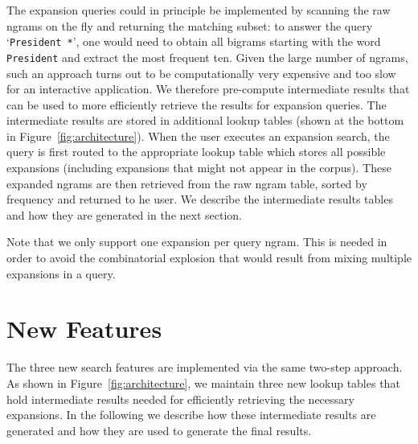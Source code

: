 \documentclass[11pt,a4paper]{article}
\newcommand{\query}[1]{\texttt{#1}}
\begin{document}
The expansion queries could in principle be implemented by scanning the raw ngrams on the fly and returning the matching subset: to answer the query `\query{President *}', one would need to obtain all bigrams starting with the word \query{President} and extract the most frequent ten. Given the large number of ngrams, such an approach turns out to be computationally very expensive and too slow for an interactive application. We therefore pre-compute intermediate results that can be used to more efficiently retrieve the results for expansion queries. The intermediate results are stored in additional lookup tables (shown at the bottom in Figure~\ref{fig:architecture}). When the user executes an expansion search, the query is first routed to the appropriate lookup table which stores all possible expansions (including expansions that might not appear in the corpus).  These expanded ngrams are then retrieved from the raw ngram table, sorted by frequency and returned to he user.
We describe the intermediate results tables and how they are generated in the next section.

Note that we only support one expansion per query ngram. This is needed in order to avoid the combinatorial explosion that would result from mixing multiple expansions in a query.


\section{New Features}
\label{sec:features}
The three new search features are implemented via the same two-step approach. As shown in Figure~\ref{fig:architecture}, we maintain three new lookup tables that hold intermediate results needed for efficiently retrieving the necessary expansions. In the following we describe how these intermediate results are generated and how they are used to generate the final results.
\end{document}
